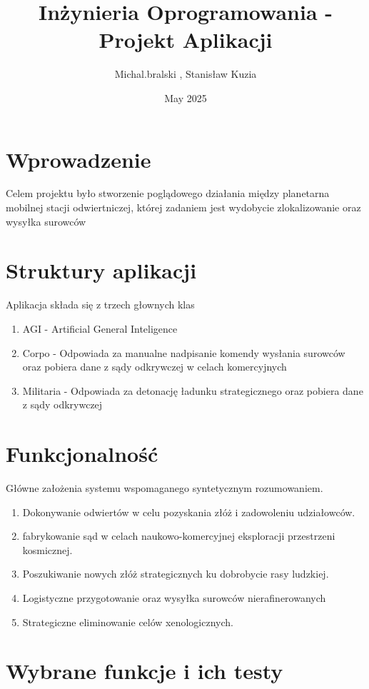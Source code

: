 \documentclass{article}
\title{Inżynieria Oprogramowania - Projekt Aplikacji}
\author{Michal.bralski , Stanisław Kuzia }
\date{May 2025}
\begin{document}
\maketitle

\section{Wprowadzenie}
Celem projektu było stworzenie poglądowego działania między planetarna mobilnej stacji odwiertniczej, której zadaniem jest wydobycie zlokalizowanie oraz wysyłka surowców 

\section{Struktury aplikacji}
Aplikacja składa się z trzech głownych klas
\begin{enumerate}
    \item AGI - Artificial General Inteligence
    \item Corpo - Odpowiada za manualne nadpisanie komendy wysłania surowców oraz pobiera dane z sądy odkrywczej w celach komercyjnych
    \item Militaria - Odpowiada za detonację ładunku strategicznego oraz pobiera dane z sądy odkrywczej
\end{enumerate}

\section{Funkcjonalność}
Główne założenia systemu wspomaganego syntetycznym rozumowaniem.
    \begin{enumerate}
        \item Dokonywanie odwiertów w celu pozyskania złóż i zadowoleniu udziałowców.
        \item fabrykowanie sąd w celach naukowo-komercyjnej eksploracji przestrzeni kosmicznej.
        \item Poszukiwanie nowych złóż strategicznych ku dobrobycie rasy ludzkiej.
        \item Logistyczne przygotowanie oraz wysyłka surowców nierafinerowanych
        \item Strategiczne eliminowanie celów xenologicznych.
    \end{enumerate}


\section{Wybrane funkcje i ich testy}
\end{document}
